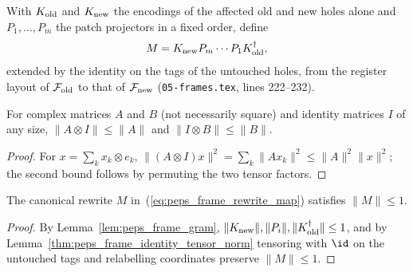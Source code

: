 \begin{definition}
    \label{def:peps_frame_rewrite}
    \leanok
    With $K_{\rm old}$ and $K_{\rm new}$ the encodings of the affected old
    and new holes alone and $P_1,\dots,P_m$ the patch projectors in a fixed
    order, define
    \begin{align}
        M=K_{\rm new}P_m\cdots P_1K_{\rm old}^\dagger ,
        \label{eq:peps_frame_rewrite_map}
    \end{align}
    extended by the identity on the tags of the untouched holes, from the register layout of $\mathcal F_{\rm old}$ to that of
    $\mathcal F_{\rm new}$ (\texttt{05-frames.tex}, lines 222--232).
\end{definition}

\begin{lemma}
    \label{thm:peps_frame_identity_tensor_norm}
    \leanok
    For complex matrices $A$ and $B$ (not necessarily square) and identity
    matrices $I$ of any size, $\lVert A\otimes I\rVert\le\lVert A\rVert$ and
    $\lVert I\otimes B\rVert\le\lVert B\rVert$.
\end{lemma}

\begin{proof}\leanok
    For $x=\sum_k x_k\otimes e_k$,
    $\lVert(A\otimes I)x\rVert^2=\sum_k\lVert Ax_k\rVert^2
        \le\lVert A\rVert^2\lVert x\rVert^2$; the second bound follows by
    permuting the two tensor factors.
\end{proof}

\begin{lemma}
    \label{lem:peps_frame_rewrite_contraction}
    \leanok
    The canonical rewrite $M$ in~(\ref{eq:peps_frame_rewrite_map}) satisfies $\lVert M\rVert\le1$.
\end{lemma}

\begin{proof}\leanok
    By Lemma~\ref{lem:peps_frame_gram}, $\lVert K_{\rm new}\rVert,\lVert P_i\rVert,\lVert K_{\rm old}^\dagger\rVert\le1$, and by Lemma~\ref{thm:peps_frame_identity_tensor_norm} tensoring with $\id$ on the
    untouched tags and relabelling coordinates preserve $\lVert M\rVert\le1$.
\end{proof}

